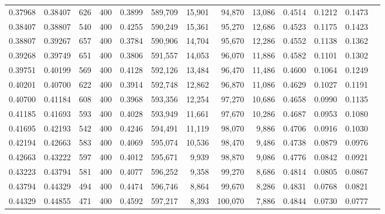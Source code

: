 \begin{tabular}{rrrrrrrrrrrrr}
0.37968 & 0.38407 &    626 & 400 &                                     0.3899 & 589,709 &  15,901 &  94,870 &  13,086 & 0.4514 & 0.1212 & 0.1473 \\
0.38407 & 0.38807 &    540 & 400 &                                     0.4255 & 590,249 &  15,361 &  95,270 &  12,686 & 0.4523 & 0.1175 & 0.1423 \\
0.38807 & 0.39267 &    657 & 400 &                                     0.3784 & 590,906 &  14,704 &  95,670 &  12,286 & 0.4552 & 0.1138 & 0.1362 \\
0.39268 & 0.39749 &    651 & 400 &                                     0.3806 & 591,557 &  14,053 &  96,070 &  11,886 & 0.4582 & 0.1101 & 0.1302 \\
0.39751 & 0.40199 &    569 & 400 &                                     0.4128 & 592,126 &  13,484 &  96,470 &  11,486 & 0.4600 & 0.1064 & 0.1249 \\
0.40201 & 0.40700 &    622 & 400 &                                     0.3914 & 592,748 &  12,862 &  96,870 &  11,086 & 0.4629 & 0.1027 & 0.1191 \\
0.40700 & 0.41184 &    608 & 400 &                                     0.3968 & 593,356 &  12,254 &  97,270 &  10,686 & 0.4658 & 0.0990 & 0.1135 \\
0.41185 & 0.41693 &    593 & 400 &                                     0.4028 & 593,949 &  11,661 &  97,670 &  10,286 & 0.4687 & 0.0953 & 0.1080 \\
0.41695 & 0.42193 &    542 & 400 &                                     0.4246 & 594,491 &  11,119 &  98,070 &   9,886 & 0.4706 & 0.0916 & 0.1030 \\
0.42194 & 0.42663 &    583 & 400 &                                     0.4069 & 595,074 &  10,536 &  98,470 &   9,486 & 0.4738 & 0.0879 & 0.0976 \\
0.42663 & 0.43222 &    597 & 400 &                                     0.4012 & 595,671 &   9,939 &  98,870 &   9,086 & 0.4776 & 0.0842 & 0.0921 \\
0.43223 & 0.43794 &    581 & 400 &                                     0.4077 & 596,252 &   9,358 &  99,270 &   8,686 & 0.4814 & 0.0805 & 0.0867 \\
0.43794 & 0.44329 &    494 & 400 &                                     0.4474 & 596,746 &   8,864 &  99,670 &   8,286 & 0.4831 & 0.0768 & 0.0821 \\
0.44329 & 0.44855 &    471 & 400 &                                     0.4592 & 597,217 &   8,393 & 100,070 &   7,886 & 0.4844 & 0.0730 & 0.0777 \\

\end{tabular}
